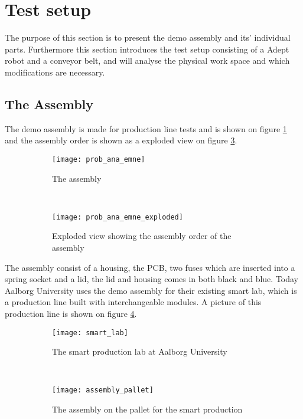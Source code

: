 \section{Test setup}
The purpose of this section is to present the demo assembly and its'  individual parts. Furthermore this section introduces the test setup consisting of a Adept robot and a conveyor belt, and will analyse the physical work space and which modifications are necessary.  

\subsection{The Assembly}
The demo assembly is made for production line tests and is shown on figure \ref{fig_assembly} and the assembly order is shown as a exploded view on figure \ref{fig_exploded}. 
\begin{figure}[htbp!]
\centering
\begin{subfigure}[t]{0.45\textwidth}
\centering
\texttt{[image: prob\_ana\_emne]}
\caption{The assembly}
\label{fig_assembly}  
\end{subfigure}~~
\begin{subfigure}[t]{0.45\textwidth}
\centering
\texttt{[image: prob\_ana\_emne\_exploded]}
\caption{Exploded view showing the assembly order of the assembly}
\label{fig_exploded}  
\end{subfigure}
\caption{}
\end{figure}\newline
\noindent The assembly consist of a housing, the PCB, two fuses which are inserted into a spring socket and a lid, the lid and housing comes in both black and blue. Today Aalborg University uses the demo assembly for their existing smart lab, which is a production line built with interchangeable modules. A picture of this production line is shown on figure \ref{fig_smart_lab}.
\begin{figure}[htbp!]
\centering
\begin{subfigure}[t]{0.45\textwidth}
\texttt{[image: smart\_lab]}
\caption{The smart production lab at Aalborg University}
\label{fig_smart_lab}  
\end{subfigure}~~
\begin{subfigure}[t]{0.5\textwidth}
\texttt{[image: assembly\_pallet]}
\caption{The assembly on the pallet for the smart production}
\label{fig_assembly_pallet}
\end{subfigure}
\caption{}
\end{figure}\newline
